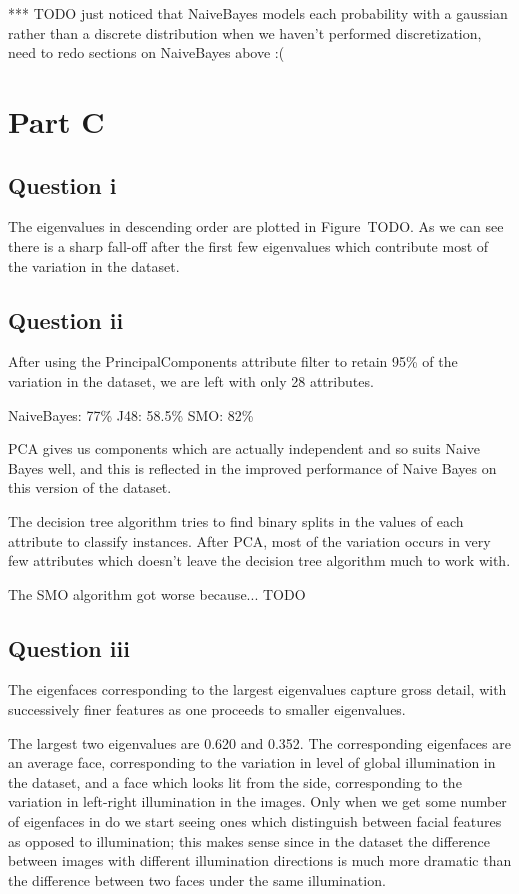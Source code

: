 \documentclass[a4paper]{article}
\begin{document}
*** TODO just noticed that NaiveBayes models each probability with a gaussian rather than a discrete distribution when we haven't performed discretization, need to redo sections on NaiveBayes above :(

\section*{Part C}
\subsection*{Question i}

The eigenvalues in descending order are plotted in Figure~TODO. As we can see there is a sharp fall-off after the first few eigenvalues which contribute most of the variation in the dataset.

\subsection*{Question ii}

After using the PrincipalComponents attribute filter to retain 95\% of the variation in the dataset, we are left with only 28 attributes.

NaiveBayes: 77\%
J48: 58.5\%
SMO: 82\%

PCA gives us components which are actually independent and so suits Naive Bayes well, and this is reflected in the improved performance of Naive Bayes on this version of the dataset.

The decision tree algorithm tries to find binary splits in the values of each attribute to classify instances. After PCA, most of the variation occurs in very few attributes which doesn't leave the decision tree algorithm much to work with.

The SMO algorithm got worse because... TODO

\subsection*{Question iii}

The eigenfaces corresponding to the largest eigenvalues capture gross detail, with successively finer features as one proceeds to smaller eigenvalues.

The largest two eigenvalues are 0.620 and 0.352. The corresponding eigenfaces are an average face, corresponding to the variation in level of global illumination in the dataset, and a face which looks lit from the side, corresponding to the variation in left-right illumination in the images. Only when we get some number of eigenfaces in do we start seeing ones which distinguish between facial features as opposed to illumination; this makes sense since in the dataset the difference between images with different illumination directions is much more dramatic than the difference between two faces under the same illumination.
\end{document}
